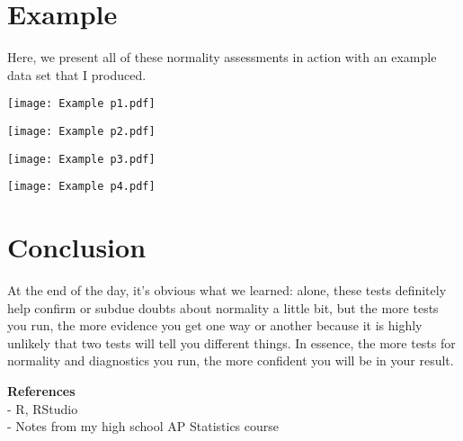 \documentclass[12pt]{article}
\begin{document}
\begin{flushleft}
\section{Example}\label{sec:chapter}
Here, we present all of these normality assessments in action with an example data set that I produced.
\centerline{\texttt{[image: Example p1.pdf]}}
\centerline{\texttt{[image: Example p2.pdf]}}
\centerline{\texttt{[image: Example p3.pdf]}}
\centerline{\texttt{[image: Example p4.pdf]}}

\section{Conclusion}\label{sec:chapter}
At the end of the day, it's obvious what we learned: alone, these tests definitely help confirm or subdue doubts about normality a little bit, but the more tests you run, the more evidence you get one way or another because it is highly unlikely that two tests will tell you different things. In essence, the more tests for normality and diagnostics you run, the more confident you will be in your result.


\textbf{References}\\
- R, RStudio\\
- Notes from my high school AP Statistics course

\end{flushleft}
\end{document}
